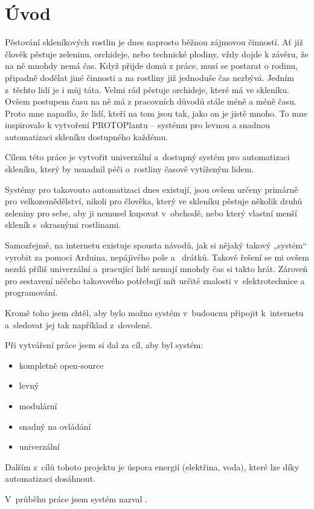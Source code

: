 \chapter*{Úvod}
Pěstování skleníkových rostlin je dnes naprosto běžnou zájmovou činností. 
Ať již člověk pěstuje zeleninu, orchideje, nebo technické plodiny, vždy dojde k závěru, že na ně mnohdy nemá čas.
Když přijde domů z práce, musí se postarat o rodinu, připadně dodělat jiné činnosti a na rostliny již jednoduše čas nezbývá.
Jedním z~těchto lidí je i můj táta.
Velmi rád pěstuje orchideje, které má ve skleníku.
Ovšem postupem času na ně má z pracovních důvodů stále méně a méně času.
Proto mne napadlo, že lidí, kteří na tom jsou tak, jako on je jistě mnoho.
To mne inspirovalo k vytvoření PROTOPlantu -- systému pro levnou a snadnou automatizaci skleníku dostupného každému. 

Cílem této práce je vytvořit univerzální a~dostupný systém pro automatizaci skleníku, který by usnadnil péči o~rostliny časově vytíženým lidem. 

Systémy pro takovouto automatizaci dnes existují, jsou ovšem určeny primárně pro velkozemědělství, nikoli pro člověka, který ve skleníku pěstuje několik druhů zeleniny pro sebe, aby ji nemusel kupovat v~obchodě, nebo který vlastní menší skleník s~okrasnými rostlinami. 

Samozřejmě, na internetu existuje spousta návodů, jak si nějaký takový „systém“ vyrobit za pomoci Arduina, nepájivého pole a~ drátků.
Takové řešení se mi ovšem nezdá příliš univerzální a~pracující lidé nemají mnohdy čas si takto hrát.
Zároveň pro sestavení něčeho takovového potřebují mít určité znalosti v~elektrotechnice a programování.

Kromě toho jsem chtěl, aby bylo možno systém v~budoucnu připojit k~internetu a~sledovat jej tak například z~dovolené.
\newline

Při vytváření práce jsem si dal za cíl, aby byl systém:
\begin{itemize}
    \item kompletně open-source
    \item levný
    \item modulární
    \item snadný na ovládání
    \item univerzální
\end{itemize}

Dalším z~cílů tohoto projektu je úspora energií (elektřina, voda), které lze díky automatizaci dosáhnout.

V~průběhu práce jsem systém nazval .

\newpage
